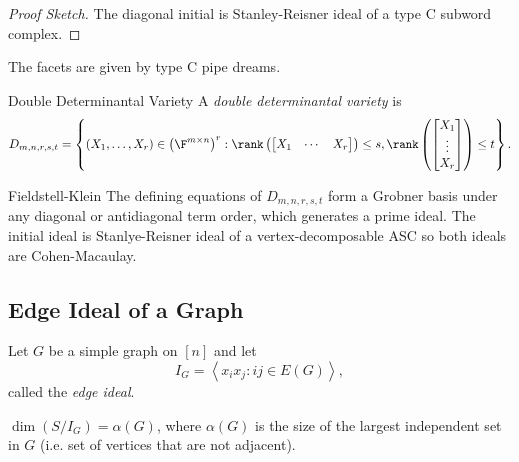 \documentclass[co439]{subfiles}
\begin{document}
    \begin{proof}[Proof Sketch]
        The diagonal initial is Stanley-Reisner ideal of a type C subword complex.
    \end{proof}

    \np The facets are given by type C pipe dreams.

    \begin{example}{Double Determinantal Variety}
        A \emph{double determinantal variety} is
        \begin{equation*}
            D_{m,n,r,s,t} = \left\lbrace \left( X_1,\ldots,X_r \right)\in \left( \F^{m\times n} \right)^r : \rank\left( \begin{bmatrix} X_1 & \cdots & X_r \end{bmatrix}\right) \leq s, \rank\left( \begin{bmatrix} X_1 \\ \vdots \\ X_r \end{bmatrix} \right)\leq t \right\rbrace.
        \end{equation*}
    \end{example}
    
    \rruleline
    
    \begin{theorem}{Fieldstell-Klein}
        The defining equations of $D_{m,n,r,s,t}$ form a Grobner basis under any diagonal or antidiagonal term order, which generates a prime ideal. The initial ideal is Stanlye-Reisner ideal of a vertex-decomposable ASC so both ideals are Cohen-Macaulay.
    \end{theorem}

    \rruleline
    
    \subsection{Edge Ideal of a Graph}
    
    Let $G$ be a simple graph on $\left[ n \right]$ and let
    \begin{equation*}
        I_G = \left< x_ix_j : ij\in E\left( G \right) \right>, 
    \end{equation*}
    called the \emph{edge ideal}.

    \begin{prop}{}
        $\dim\left( S /I_G \right) = \alpha\left( G \right)$, where $\alpha\left( G \right)$ is the size of the largest independent set in $G$ (i.e. set of vertices that are not adjacent).
    \end{prop}
\end{document}
